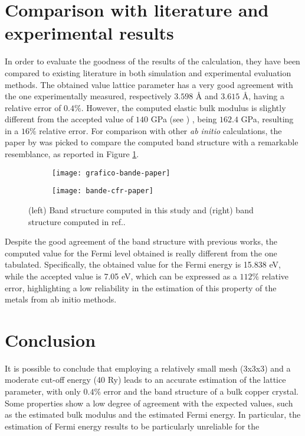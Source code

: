 \documentclass[
	12pt, %
]{fphw}
\begin{document}
\section*{Comparison with literature and experimental results}
In order to evaluate the goodness of the results of the calculation, they have been compared to existing literature in both simulation and experimental evaluation methods.
The obtained value lattice parameter has a very good agreement with the one experimentally measured, respectively $3.598$ \r{A} and $3.615$ \r{A}, having a relative error of $0.4 \%$.
However, the computed elastic bulk modulus is slightly different from the accepted value of $140$ GPa (see \cite{chrzanowski_bulk_2018}) , being $162.4$ GPa, resulting in a $16\%$ relative error.
For comparison with other \textit{ab initio} calculations, the paper by \cite{mishra_electronic_2017} was picked to compare the computed band structure with a remarkable resemblance, as reported in Figure \ref{cfr-bands}.
\begin{figure}[h!]
	\centering
	\begin{subfigure}{0.4\textwidth}
		\texttt{[image: grafico-bande-paper]}
	\end{subfigure}
	\begin{subfigure}{0.4\textwidth}
		\texttt{[image: bande-cfr-paper]}
	\end{subfigure}
	\caption{(left) Band structure computed in this study and (right) band structure computed in ref.\cite{mishra_electronic_2017}.}
	\label{cfr-bands}
\end{figure}
Despite the good agreement of the band structure with previous works, the computed value for the Fermi level obtained is really different from the one tabulated. 
Specifically, the obtained value for the Fermi energy is 15.838 eV, while the accepted value is 7.05 eV, which can be expressed as a $112\%$ relative error, highlighting a low reliability in the estimation of this property of the metals from ab initio methods.

\section*{Conclusion}
It is possible to conclude that employing a relatively small mesh (3x3x3) and a moderate cut-off energy (40 Ry) leads to an accurate estimation of the lattice parameter, with only $0.4\%$ error and the band structure of a bulk copper crystal. 
Some properties show a low degree of agreement with the expected values, such as the estimated bulk modulus and the estimated Fermi energy. 
In particular, the estimation of Fermi energy results to be particularly unreliable for the  



\end{document}
